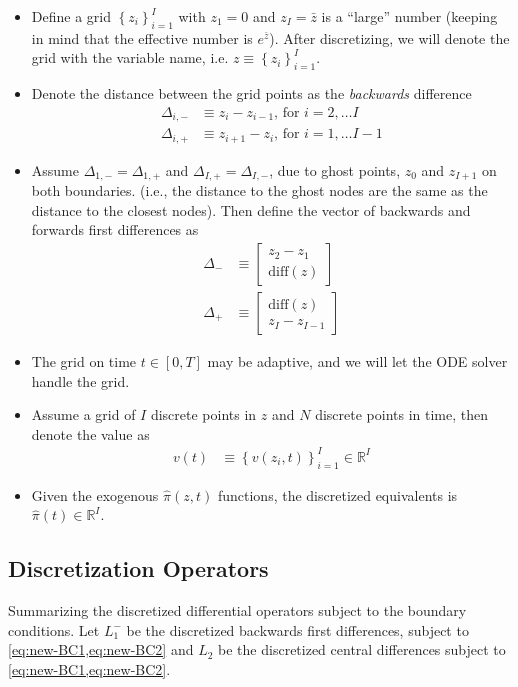 \documentclass[11pt]{article}
\newcommand{\R}{\ensuremath{\mathbb{R}}}
\newcommand{\set}[1]{\ensuremath{\left\{{#1}\right\}}}
\begin{document}
\begin{itemize}
	\item Define a  grid $\set{z_i}_{i=1}^I$ with $z_1 = 0$ and $z_I = \bar{z}$ is a ``large'' number (keeping in mind that the effective number is $e^{\bar{z}}$).  After discretizing, we will denote the grid with the variable name, i.e. $z \equiv \set{z_i}_{i=1}^I$.
	\item Denote the distance between the grid points as the \textit{backwards} difference
	\begin{align}
			\Delta_{i,-} &\equiv z_i - z_{i-1},\, \text{for } i = 2,\ldots I\\
			\Delta_{i,+} &\equiv z_{i+1} - z_i,\, \text{for } i = 1,\ldots I-1
	\end{align}
	\item Assume $\Delta_{1, -} = \Delta_{1, +}$ and $\Delta_{I, +} = \Delta_{I, -}$, due to ghost points, $z_0$ and $z_{I+1}$ on both boundaries. (i.e., the distance to the ghost nodes are the same as the distance to the closest nodes).  Then define the vector of backwards and forwards first differences as
	\begin{align}
		\Delta_{-} &\equiv \begin{bmatrix} z_2 - z_1 \\
			\text{diff}(z)
		\end{bmatrix}\\
		\Delta_{+} &\equiv \begin{bmatrix} \text{diff}(z)\\
			z_I - z_{I-1}
		\end{bmatrix}
	\end{align}
	\item The grid on time $t \in [0,T]$ may be adaptive, and we will let the ODE solver handle the grid.	
	\item Assume a grid of $I$ discrete points in $z$ and $N$ discrete points in time, then denote the value as
	\begin{align}
		v(t) &\equiv \set{v(z_i, t)}_{i=1}^I\in\R^I
	\end{align}
\item Given the exogenous $\hat{\pi}(z,t)$ functions, the discretized equivalents is $\hat{\pi}(t) \in \R^I$.
\end{itemize}

\subsection{Discretization Operators}\label{sec:discretization-operators}
Summarizing the discretized differential operators subject to the boundary conditions.  Let $L_1^{-}$ be the discretized backwards first differences, subject to \cref{eq:new-BC1,eq:new-BC2} and $L_2$ be the discretized central differences subject to \cref{eq:new-BC1,eq:new-BC2}.
\end{document}
